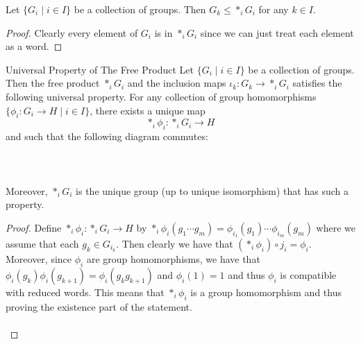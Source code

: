 \documentclass[a4paper]{article}
\begin{document}
\begin{prp}{}{} Let $\{G_i\;|\;i\in I\}$ be a collection of groups. Then $G_k\leq\ast_iG_i$ for any $k\in I$. \tcbline
\begin{proof}
Clearly every element of $G_i$ is in $\ast_iG_i$ since we can just treat each element as a word. 
\end{proof}
\end{prp}

\begin{prp}{Universal Property of The Free Product}{} Let $\{G_i\;|\;i\in I\}$ be a collection of groups. Then the free product $\ast_i G_i$ and the inclusion maps $\iota_k:G_k\to\ast_i G_i$ satisfies the following universal property. For any collection of group homomorphisms $\{\phi_i:G_i\to H\;|\;i\in I\}$, there exists a unique map $$\ast_i\phi_i:\ast_i G_i\to H$$ and such that the following diagram commutes: \\~\\
 \\~\\
Moreover, $\ast_i G_i$ is the unique group (up to unique isomorphism) that has such a property. \tcbline
\begin{proof}
Define $\ast_i\phi_i:\ast_iG_i\to H$ by $\ast_i\phi_i(g_1\cdots g_m)=\phi_{i_1}(g_1)\cdots\phi_{i_m}(g_m)$ where we assume that each $g_k\in G_{i_k}$. Then clearly we have that $(\ast_i\phi_i)\circ j_i=\phi_i$. Moreover, since $\phi_i$ are group homomorphisms, we have that $\phi_i(g_k)\phi_i(g_{k+1})=\phi_i(g_kg_{k+1})$ and $\phi_i(1)=1$ and thus $\phi_i$ is compatible with reduced words. This means that $\ast_i\phi_i$ is a group homomorphism and thus proving the existence part of the statement. \\~\\


\end{proof}
\end{prp}
\end{document}
